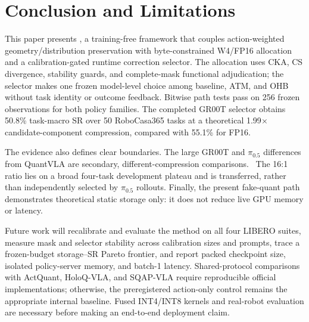 \section{Conclusion and Limitations}
\label{sec:conclusion}

This paper presents \method, a training-free framework that couples action-weighted geometry/distribution preservation with byte-constrained W4/FP16 allocation and a calibration-gated runtime correction selector. The allocation uses CKA, CS divergence, stability guards, and complete-mask functional adjudication; the selector makes one frozen model-level choice among baseline, ATM, and OHB without task identity or outcome feedback. Bitwise path tests pass on 256 frozen observations for both policy families. The completed GR00T selector obtains 50.8\% task-macro SR over 50 RoboCasa365 tasks at a theoretical 1.99$\times$ candidate-component compression, compared with 55.1\% for FP16. \PiSelectorResultStatus

The evidence also defines clear boundaries. The large GR00T and $\pi_{0.5}$ differences from QuantVLA are secondary, different-compression comparisons. \SameBudgetConclusionStatus\ The 16:1 ratio lies on a broad four-task development plateau and is transferred, rather than independently selected by $\pi_{0.5}$ rollouts. Finally, the present fake-quant path demonstrates theoretical static storage only: it does not reduce live GPU memory or latency.

Future work will recalibrate and evaluate the method on all four LIBERO suites, measure mask and selector stability across calibration sizes and prompts, trace a frozen-budget storage--SR Pareto frontier, and report packed checkpoint size, isolated policy-server memory, and batch-1 latency. Shared-protocol comparisons with ActQuant, HoloQ-VLA, and SQAP-VLA require reproducible official implementations; otherwise, the preregistered action-only control remains the appropriate internal baseline. Fused INT4/INT8 kernels and real-robot evaluation are necessary before making an end-to-end deployment claim.
